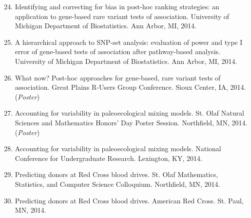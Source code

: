 \documentclass[margin]{res}
\newenvironment{benumerate}[1]{
    \let\oldItem\item
    \def\item{\addtocounter{enumi}{-2}\oldItem}
    
    \begin{enumerate}
    \setcounter{enumi}{#1}
    \addtocounter{enumi}{1}
}{
    \end{enumerate}
}
\begin{document}
\begin{resume}
\begin{benumerate}{23}
\item %
Identifying and correcting for bias in post-hoc ranking strategies: an application to gene-based rare variant tests of association. University of Michigan Department of Biostatistics. Ann Arbor, MI, 2014.

\item %
A hierarchical approach to SNP-set analysis: evaluation of power and type I error of gene-based tests of association after pathway-based analysis. University of Michigan Department of Biostatistics. Ann Arbor, MI, 2014.


\item %
What now? Post-hoc approaches for gene-based, rare variant tests of association. Great Plains R-Users Group Conference. Sioux Center, IA, 2014. (\textit{Poster})

\item %
Accounting for variability in paleoecological mixing models. St. Olaf Natural Sciences and Mathematics Honors’ Day Poster Session. Northfield, MN, 2014. (\textit{Poster})


\item %
Accounting for variability in paleoecological mixing models. National Conference for Undergraduate Research. Lexington, KY, 2014.

\item %
Predicting donors at Red Cross blood drives. St. Olaf Mathematics, Statistics, and Computer Science Colloquium. Northfield, MN, 2014.

\item %
Predicting donors at Red Cross blood drives. American Red Cross. St. Paul, MN, 2014.


\end{benumerate}
\end{resume}
\end{document}

